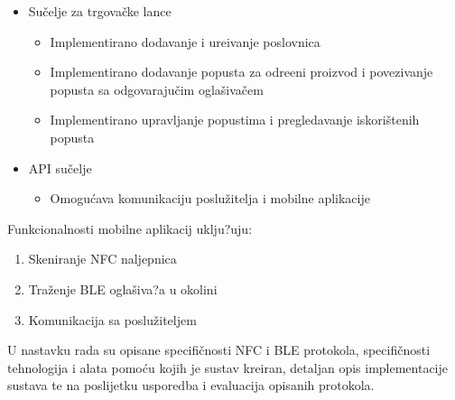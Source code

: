 \begin{itemize}
	\item Su\v{c}elje za trgova\v{c}ke lance
	\begin{itemize}
		\item Implementirano dodavanje i ure\dj ivanje poslovnica
		\item Implementirano dodavanje popusta za odre\dj eni proizvod i povezivanje popusta sa odgovaraju\v{c}im ogla\v{s}iva\v{c}em
		\item Implementirano upravljanje popustima i pregledavanje iskori\v{s}tenih popusta
	\end{itemize}
	\item API su\v{c}elje
	
	\begin{itemize}
		\item Omogu\'{c}ava komunikaciju poslu\v{z}itelja i mobilne aplikacije
	\end{itemize}
\end{itemize}

Funkcionalnosti mobilne aplikacij uklju?uju:
\begin{enumerate}
	\item Skeniranje NFC naljepnica
	\item Tra\v{z}enje BLE ogla\v{s}iva?a u okolini
	\item Komunikacija sa poslu\v{z}iteljem
\end{enumerate}

U nastavku rada su opisane specifi\v{c}nosti NFC i BLE protokola, specifi\v{c}nosti tehnologija i alata pomo\'{c}u kojih je sustav kreiran, detaljan opis implementacije sustava te na poslijetku usporedba i evaluacija opisanih protokola.





